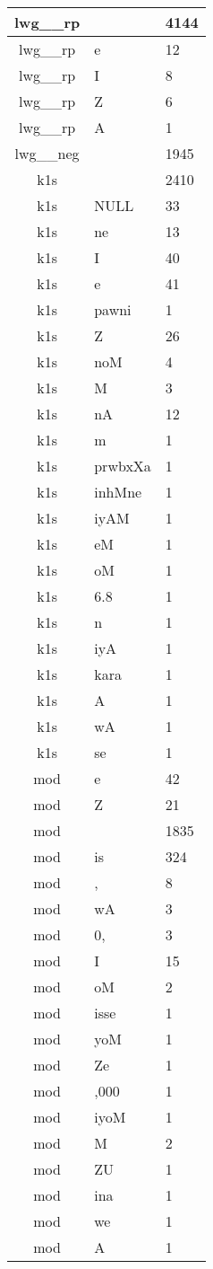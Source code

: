 \documentclass[a4 paper]{article}
\begin{document}
\begin{longtable}{cp{}p{}}
lwg\_\_rp &  & 4144\\ \midrule lwg\_\_rp & e & 12\\ \midrule lwg\_\_rp & I & 8\\ \midrule lwg\_\_rp & Z & 6\\ \midrule lwg\_\_rp & A & 1\\ \midrule 
lwg\_\_neg &  & 1945\\ \midrule 
k1s &  & 2410\\ \midrule k1s & NULL & 33\\ \midrule k1s & ne & 13\\ \midrule k1s & I & 40\\ \midrule k1s & e & 41\\ \midrule k1s & pawni & 1\\ \midrule k1s & Z & 26\\ \midrule k1s & noM & 4\\ \midrule k1s & M & 3\\ \midrule k1s & nA & 12\\ \midrule k1s & m & 1\\ \midrule k1s & prwbxXa & 1\\ \midrule k1s & inhMne & 1\\ \midrule k1s & iyAM & 1\\ \midrule k1s & eM & 1\\ \midrule k1s & oM & 1\\ \midrule k1s & 6.8 & 1\\ \midrule k1s & n & 1\\ \midrule k1s & iyA & 1\\ \midrule k1s & kara & 1\\ \midrule k1s & A & 1\\ \midrule k1s & wA & 1\\ \midrule k1s & se & 1\\ \midrule 
mod & e & 42\\ \midrule mod & Z & 21\\ \midrule mod &  & 1835\\ \midrule mod & is & 324\\ \midrule mod & , & 8\\ \midrule mod & wA & 3\\ \midrule mod & 0, & 3\\ \midrule mod & I & 15\\ \midrule mod & oM & 2\\ \midrule mod & isse & 1\\ \midrule mod & yoM & 1\\ \midrule mod & Ze & 1\\ \midrule mod & ,000 & 1\\ \midrule mod & iyoM & 1\\ \midrule mod & M & 2\\ \midrule mod & ZU & 1\\ \midrule mod & ina & 1\\ \midrule mod & we & 1\\ \midrule mod & A & 1\\ \midrule 

\end{longtable}
\end{document}
